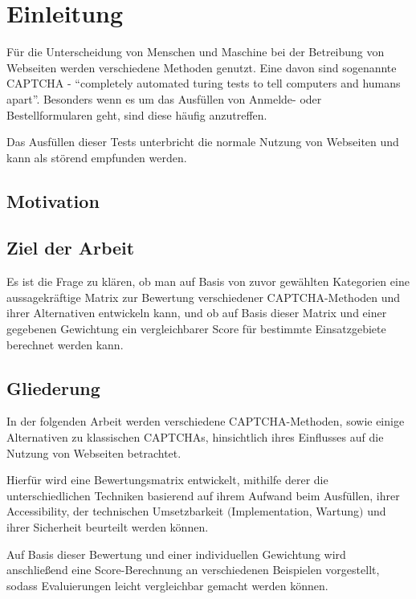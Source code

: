 \chapter{Einleitung}
\label{ch:intro}

Für die Unterscheidung von Menschen und Maschine bei der Betreibung von Webseiten werden verschiedene Methoden genutzt.
Eine davon sind sogenannte CAPTCHA - ``completely automated turing tests to tell computers and humans apart''.
Besonders wenn es um das Ausfüllen von Anmelde- oder Bestellformularen geht, sind diese häufig anzutreffen.

Das Ausfüllen dieser Tests unterbricht die normale Nutzung von Webseiten und kann als störend empfunden werden.





\section{Motivation}
\label{sec:intro:motivation}


%
%
\section{Ziel der Arbeit}
\label{sec:intro:goal}

Es ist die Frage zu klären, ob man auf Basis von zuvor gewählten Kategorien eine aussagekräftige Matrix zur
Bewertung verschiedener CAPTCHA-Methoden und ihrer Alternativen entwickeln kann, und ob auf Basis dieser Matrix und einer gegebenen Gewichtung
ein vergleichbarer Score für bestimmte Einsatzgebiete berechnet werden kann.

%
%
\section{Gliederung}
\label{sec:intro:structure}
In der folgenden Arbeit werden verschiedene CAPTCHA-Methoden, sowie einige Alternativen zu klassischen CAPTCHAs,
hinsichtlich ihres Einflusses auf die Nutzung von Webseiten betrachtet.

Hierfür wird eine Bewertungsmatrix entwickelt, mithilfe derer die unterschiedlichen Techniken basierend auf
ihrem Aufwand beim Ausfüllen, ihrer Accessibility, der technischen Umsetzbarkeit $($Implementation, Wartung$)$ und ihrer Sicherheit beurteilt werden können.

Auf Basis dieser Bewertung und einer individuellen Gewichtung wird anschließend eine Score-Berechnung an verschiedenen Beispielen vorgestellt,
sodass Evaluierungen leicht vergleichbar gemacht werden können.